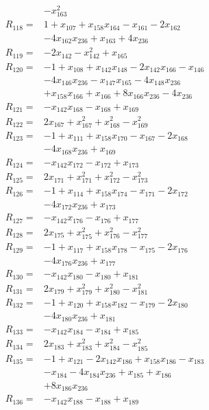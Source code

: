 \begin{align*}
&-x_{163}^{2}\\[3pt]
R_{118}={}&1 +x_{107} +x_{158}x_{164} -x_{161} -2x_{162}\\
&-4x_{162}x_{236} +x_{163} +4x_{236}\\[3pt]
R_{119}={}&-2x_{142} -x_{142}^{2} +x_{165}\\[3pt]
R_{120}={}&-1 +x_{108} +x_{142}x_{148} -2x_{142}x_{166} -x_{146}\\
&-4x_{146}x_{236} -x_{147}x_{165} -4x_{148}x_{236}\\
&+x_{158}x_{166} +x_{166} +8x_{166}x_{236} -4x_{236}\\[3pt]
R_{121}={}&-x_{142}x_{168} -x_{168} +x_{169}\\[3pt]
R_{122}={}&2x_{167} +x_{167}^{2} +x_{168}^{2} -x_{169}^{2}\\[3pt]
R_{123}={}&-1 +x_{111} +x_{158}x_{170} -x_{167} -2x_{168}\\
&-4x_{168}x_{236} +x_{169}\\[3pt]
R_{124}={}&-x_{142}x_{172} -x_{172} +x_{173}\\[3pt]
R_{125}={}&2x_{171} +x_{171}^{2} +x_{172}^{2} -x_{173}^{2}\\[3pt]
R_{126}={}&-1 +x_{114} +x_{158}x_{174} -x_{171} -2x_{172}\\
&-4x_{172}x_{236} +x_{173}\\[3pt]
R_{127}={}&-x_{142}x_{176} -x_{176} +x_{177}\\[3pt]
R_{128}={}&2x_{175} +x_{175}^{2} +x_{176}^{2} -x_{177}^{2}\\[3pt]
R_{129}={}&-1 +x_{117} +x_{158}x_{178} -x_{175} -2x_{176}\\
&-4x_{176}x_{236} +x_{177}\\[3pt]
R_{130}={}&-x_{142}x_{180} -x_{180} +x_{181}\\[3pt]
R_{131}={}&2x_{179} +x_{179}^{2} +x_{180}^{2} -x_{181}^{2}\\[3pt]
R_{132}={}&-1 +x_{120} +x_{158}x_{182} -x_{179} -2x_{180}\\
&-4x_{180}x_{236} +x_{181}\\[3pt]
R_{133}={}&-x_{142}x_{184} -x_{184} +x_{185}\\[3pt]
R_{134}={}&2x_{183} +x_{183}^{2} +x_{184}^{2} -x_{185}^{2}\\[3pt]
R_{135}={}&-1 +x_{121} -2x_{142}x_{186} +x_{158}x_{186} -x_{183}\\
&-x_{184} -4x_{184}x_{236} +x_{185} +x_{186}\\
&+8x_{186}x_{236}\\[3pt]
R_{136}={}&-x_{142}x_{188} -x_{188} +x_{189}\\[3pt]

\end{align*}
